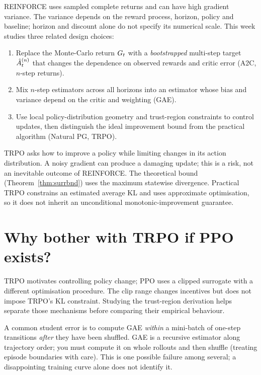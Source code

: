 \documentclass[11pt,oneside]{scrbook}
\begin{document}
REINFORCE uses sampled complete returns and can have high gradient variance. The variance depends on the reward process, horizon, policy and baseline; horizon and discount alone do not specify its numerical scale. This week studies three related design choices:

\begin{enumerate}[leftmargin=*]
  \item Replace the Monte-Carlo return $G_t$ with a \emph{bootstrapped} multi-step target $\hat{A}^{(n)}_t$ that changes the dependence on observed rewards and critic error (A2C, $n$-step returns).
  \item Mix $n$-step estimators across all horizons into an estimator whose bias and variance depend on the critic and weighting (GAE).
  \item Use local policy-distribution geometry and trust-region constraints to control updates, then distinguish the ideal improvement bound from the practical algorithm (Natural PG, TRPO).
\end{enumerate}

\begin{intuition}
TRPO asks how to improve a policy while limiting changes in its action distribution. A noisy gradient can produce a damaging update; this is a risk, not an inevitable outcome of REINFORCE. The theoretical bound (Theorem~\ref{thm:surrbnd}) uses the maximum statewise divergence. Practical TRPO constrains an estimated average KL and uses approximate optimisation, so it does not inherit an unconditional monotonic-improvement guarantee.
\end{intuition}

\section*{Why bother with TRPO if PPO exists?}
TRPO motivates controlling policy change; PPO uses a clipped surrogate with a different optimisation procedure. The clip range changes incentives but does not impose TRPO's KL constraint. Studying the trust-region derivation helps separate those mechanisms before comparing their empirical behaviour.

\begin{pitfall}
A common student error is to compute GAE \emph{within} a mini-batch of one-step transitions \emph{after} they have been shuffled. GAE is a recursive estimator along trajectory order; you must compute it on whole rollouts and then shuffle (treating episode boundaries with care). This is one possible failure among several; a disappointing training curve alone does not identify it.
\end{pitfall}
\end{document}
